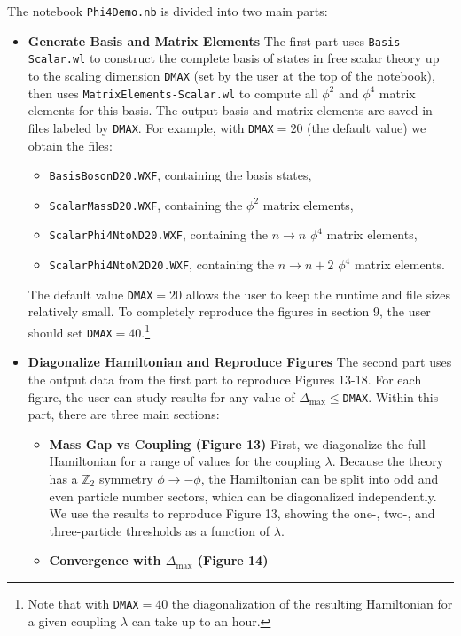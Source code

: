 \documentclass[12pt]{article}
\newcommand\De\Delta
\newcommand{\ra}{\rightarrow}
\newcommand{\Dmax}{\De_{\max}}
\begin{document}
The notebook {\tt Phi4Demo.nb} is divided into two main parts:
\begin{itemize}
\item \textbf{Generate Basis and Matrix Elements} \newline
The first part uses {\tt Basis-Scalar.wl} to construct the complete basis of states in free scalar theory up to the scaling dimension {\tt DMAX} (set by the user at the top of the notebook), then uses {\tt MatrixElements-Scalar.wl} to compute all $\phi^2$ and $\phi^4$ matrix elements for this basis. The output basis and matrix elements are saved in files labeled by {\tt DMAX}. For example, with {\tt DMAX}$=20$ (the default value) we obtain the files:
\begin{itemize}
\item {\tt BasisBosonD20.WXF}, containing the basis states,
\item {\tt ScalarMassD20.WXF}, containing the $\phi^2$ matrix elements,
\item {\tt ScalarPhi4NtoND20.WXF}, containing the $n\ra n$ $\phi^4$ matrix elements,
\item {\tt ScalarPhi4NtoN2D20.WXF}, containing the $n\ra n+2$ $\phi^4$ matrix elements.
\end{itemize}
The default value {\tt DMAX}$=20$ allows the user to keep the runtime and file sizes relatively small. To completely reproduce the figures in section 9, the user should set {\tt DMAX}$=40$.\footnote{Note that with {\tt DMAX}$=40$ the diagonalization of the resulting Hamiltonian for a given coupling $\lambda$ can take up to an hour.}
\item \textbf{Diagonalize Hamiltonian and Reproduce Figures} \newline
The second part uses the output data from the first part to reproduce Figures 13-18. For each figure, the user can study results for any value of $\Dmax \leq${\tt DMAX}. Within this part, there are three main sections:
\begin{itemize}
\item \textbf{Mass Gap vs Coupling (Figure 13)} \newline
First, we diagonalize the full Hamiltonian for a range of values for the coupling $\lambda$. Because the theory has a $\mathbb{Z}_2$ symmetry $\phi \ra -\phi$, the Hamiltonian can be split into odd and even particle number sectors, which can be diagonalized independently. We use the results to reproduce Figure 13, showing the one-, two-, and three-particle thresholds as a function of $\lambda$.
\item \textbf{Convergence with $\Dmax$ (Figure 14)} \newline

\end{itemize}
\end{itemize}
\end{document}
